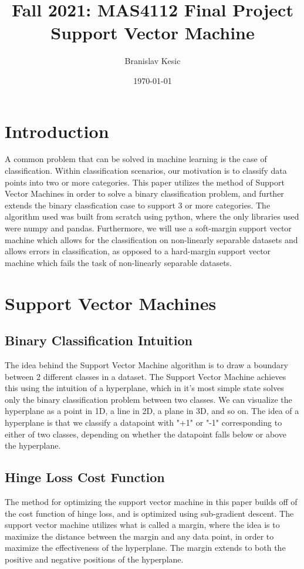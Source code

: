 \documentclass[12pt]{article}%
\begin{document}
	
	\title{Fall 2021: MAS4112 Final Project\\Support Vector Machine}
	\author{Branislav Kesic}
	\date{\today}
	\maketitle
	
	\section{Introduction}
	A common problem that can be solved in machine learning is the case of classification.  Within classification scenarios, our motivation is to classify data points into two or more categories.  This paper utilizes the method of Support Vector Machines in order to solve a binary classification problem, and further extends the binary classfication case to support 3 or more categories.  The algorithm used was built from scratch using python, where the only libraries used were numpy and pandas.  Furthermore, we will use a soft-margin support vector machine which allows for the classification on non-linearly separable datasets and allows errors in classification, as opposed to a hard-margin support vector machine which fails the task of non-linearly separable datasets.
	
	\section{Support Vector Machines}
	
	\subsection{Binary Classification Intuition}
	The idea behind the Support Vector Machine algorithm is to draw a boundary between 2 different classes in a dataset.  The Support Vector Machine achieves this using the intuition of a hyperplane, which in it's most simple state solves only the binary classification problem between two classes.  We can visualize the hyperplane as a point in 1D, a line in 2D, a plane in 3D, and so on.  The idea of a hyperplane is that we classify a datapoint with "+1" or "-1" corresponding to either of two classes, depending on whether the datapoint falls below or above the hyperplane.  
	
	\subsection{Hinge Loss Cost Function}
	The method for optimizing the support vector machine in this paper builds off of the cost function of hinge loss, and is optimized using sub-gradient descent.  The support vector machine utilizes what is called a margin, where the idea is to maximize the distance between the margin and any data point, in order to maximize the effectiveness of the hyperplane.  The margin extends to both the positive and negative positions of the hyperplane.\\
	
\end{document}
